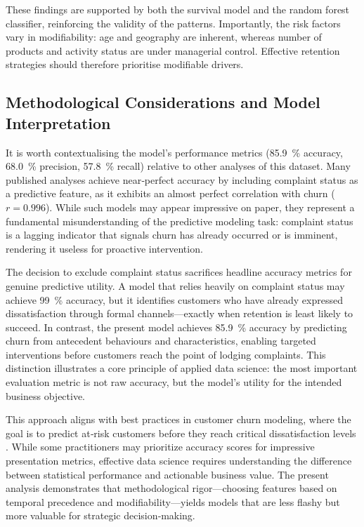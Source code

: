 \documentclass[12pt]{article}
\begin{document}
These findings are supported by both the survival model and the random forest classifier, reinforcing the validity of the patterns.  Importantly, the risk factors vary in modifiability: age and geography are inherent, whereas number of products and activity status are under managerial control.  Effective retention strategies should therefore prioritise modifiable drivers.

\subsection{Methodological Considerations and Model Interpretation}
It is worth contextualising the model's performance metrics (85.9~\% accuracy, 68.0~\% precision, 57.8~\% recall) relative to other analyses of this dataset.  Many published analyses achieve near‑perfect accuracy by including complaint status as a predictive feature, as it exhibits an almost perfect correlation with churn (\(r=0.996\)).  While such models may appear impressive on paper, they represent a fundamental misunderstanding of the predictive modeling task: complaint status is a lagging indicator that signals churn has already occurred or is imminent, rendering it useless for proactive intervention.

The decision to exclude complaint status sacrifices headline accuracy metrics for genuine predictive utility.  A model that relies heavily on complaint status may achieve 99~\% accuracy, but it identifies customers who have already expressed dissatisfaction through formal channels—exactly when retention is least likely to succeed.  In contrast, the present model achieves 85.9~\% accuracy by predicting churn from antecedent behaviours and characteristics, enabling targeted interventions before customers reach the point of lodging complaints.  This distinction illustrates a core principle of applied data science: the most important evaluation metric is not raw accuracy, but the model's utility for the intended business objective.

This approach aligns with best practices in customer churn modeling, where the goal is to predict at‑risk customers before they reach critical dissatisfaction levels \citep{kumar2022customerretention}.  While some practitioners may prioritize accuracy scores for impressive presentation metrics, effective data science requires understanding the difference between statistical performance and actionable business value.  The present analysis demonstrates that methodological rigor—choosing features based on temporal precedence and modifiability—yields models that are less flashy but more valuable for strategic decision‑making.
\end{document}

